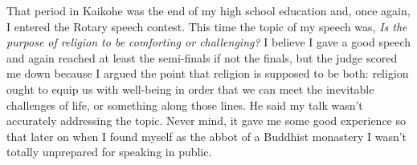 That period in Kaikohe was the end of my high school education and, once
again, I entered the Rotary speech contest. This time the topic of my
speech was, \emph{Is the purpose of religion to be comforting or
challenging?} I believe I gave a good speech and again reached at least
the semi-finals if not the finals, but the judge scored me down because
I argued the point that religion is supposed to be both: religion ought
to equip us with well-being in order that we can meet the inevitable
challenges of life, or something along those lines. He said my talk
wasn't accurately addressing the topic. Never mind, it gave me some good
experience so that later on when I found myself as the abbot of a
Buddhist monastery I wasn't totally unprepared for speaking in public.


